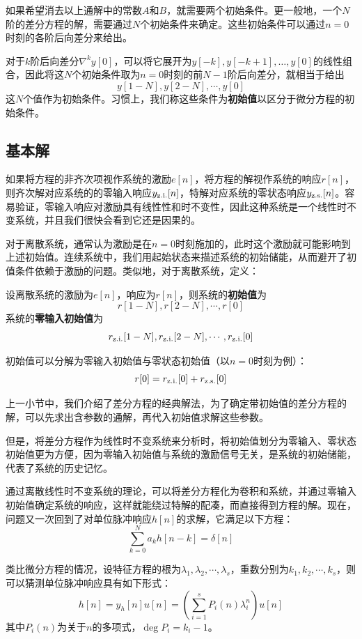 如果希望消去以上通解中的常数$A$和$B$，就需要两个初始条件。更一般地，一个$N$阶的差分方程的解，需要通过$N$个初始条件来确定。这些初始条件可以通过$n=0$时刻的各阶后向差分来给出。

对于$k$阶后向差分$\nabla^k y[0]$，可以将它展开为$y[-k],y[-k+1],\dots,y[0]$的线性组合，因此将这$N$个初始条件取为$n=0$时刻的前$N-1$阶后向差分，就相当于给出
$$y[1-N],y[2-N],\cdots,y[0]$$
这$N$个值作为初始条件。习惯上，我们称这些条件为\textbf{初始值}以区分于微分方程的初始条件。

\subsection{基本解}\label{sub:h_solution}

如果将方程的非齐次项视作系统的激励$e[n]$，将方程的解视作系统的响应$r[n]$，则齐次解对应系统的的零输入响应$y_{\operatorname{z.i.}}[n]$，特解对应系统的零状态响应$y_{\operatorname{z.s.}}[n]$。容易验证，零输入响应对激励具有线性性和时不变性，因此这种系统是一个线性时不变系统，并且我们很快会看到它还是因果的。

对于离散系统，通常认为激励是在$n=0$时刻施加的，此时这个激励就可能影响到上述初始值。连续系统中，我们用起始状态来描述系统的初始储能，从而避开了初值条件依赖于激励的问题。类似地，对于离散系统，定义：
\begin{definition}[离散系统的初始值与零输入初始值]
    设离散系统的激励为$e[n]$，响应为$r[n]$，则系统的\textbf{初始值}为
    $$r[1-N],r[2-N],\cdots,r[0]$$
    系统的\textbf{零输入初始值}为
    $$r_{\operatorname{z.i.}}[1-N],r_{\operatorname{z.i.}}[2-N],\cdots,r_{\operatorname{z.i.}}[0]$$
\end{definition}

初始值可以分解为零输入初始值与零状态初始值（以$n=0$时刻为例）：
\begin{align*}
    r[0]=r_{\operatorname{z.i.}}[0]+r_{\operatorname{z.s.}}[0]
\end{align*}

上一小节中，我们介绍了差分方程的经典解法，为了确定带初始值的差分方程的解，可以先求出含参数的通解，再代入初始值求解这些参数。

但是，将差分方程作为线性时不变系统来分析时，将初始值划分为零输入、零状态初始值更为方便，因为零输入初始值与系统的激励信号无关，是系统的初始储能，代表了系统的历史记忆。

通过离散线性时不变系统的理论，可以将差分方程化为卷积和系统，并通过零输入初始值确定系统的响应，这样就能绕过特解的配凑，而直接得到方程的解。现在，问题又一次回到了对单位脉冲响应$h[n]$的求解，它满足以下方程：
$$\sum_{k=0}^{N}a_k h[n-k] = \delta[n]$$

类比微分方程的情况，设特征方程的根为$\lambda_1,\lambda_2,\cdots,\lambda_s$，重数分别为$k_1,k_2,\cdots,k_s$，则可以猜测单位脉冲响应具有如下形式：
$$h[n]=y_h[n]u[n]=\left(\sum_{i=1}^s P_i(n) \lambda_i^n \right)u[n]$$
其中$P_i(n)$为关于$n$的多项式，$\deg P_i=k_i-1$。

